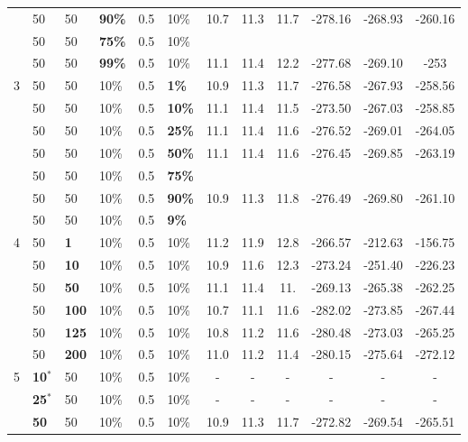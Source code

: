 \begin{sidewaystable}
\begin{tabular}{|l|l|l|l|l|l||c|c|c|c|c|c|}
    ~ & 50 & 50 & \textbf{90\%} & 0.5 & 10\% & 10.7 & 11.3 & 11.7 & -278.16 & -268.93 & -260.16 \\
    ~ & 50 & 50 & \textbf{75\%} & 0.5 & 10\% & ~ & ~ & ~ & ~ & ~ & ~ \\
    ~ & 50 & 50 & \textbf{99\%} & 0.5 & 10\% & 11.1 & 11.4 & 12.2 & -277.68 & -269.10 & -253 \\
    \hline
    3 & 50 & 50 & 10\% & 0.5 & \textbf{1\%} & 10.9 & 11.3 & 11.7 & -276.58 & -267.93 & -258.56 \\
    ~ & 50 & 50 & 10\% & 0.5 & \textbf{10\%} & 11.1 & 11.4 & 11.5 & -273.50 & -267.03 & -258.85 \\
    ~ & 50 & 50 & 10\% & 0.5 & \textbf{25\%} & 11.1 & 11.4 & 11.6 & -276.52 & -269.01 & -264.05 \\
    ~ & 50 & 50 & 10\% & 0.5 & \textbf{50\%} & 11.1 & 11.4 & 11.6 & -276.45 & -269.85 & -263.19 \\
    ~ & 50 & 50 & 10\% & 0.5 & \textbf{75\%} & ~ & ~ & ~ & ~ & ~ & ~ \\
    ~ & 50 & 50 & 10\% & 0.5 & \textbf{90\%} & 10.9 & 11.3 & 11.8 & -276.49 & -269.80 & -261.10 \\
    ~ & 50 & 50 & 10\% & 0.5 & \textbf{9\%} & ~ & ~ & ~ & ~ & ~ & ~ \\
    \hline
    4 & 50 & \textbf{1} & 10\% & 0.5 & 10\% &11.2 & 11.9 & 12.8 & -266.57 & -212.63 & -156.75 \\
    ~ & 50 & \textbf{10} & 10\% & 0.5 & 10\% & 10.9 & 11.6 & 12.3 & -273.24 & -251.40 & -226.23 \\
    ~ & 50 & \textbf{50} & 10\% & 0.5 & 10\% &  11.1 & 11.4 & 11. & -269.13 & -265.38 & -262.25 \\
    ~ & 50 & \textbf{100} & 10\% & 0.5 & 10\% & 10.7 & 11.1 & 11.6 & -282.02 & -273.85 & -267.44 \\
    ~ & 50 & \textbf{125} & 10\% & 0.5 & 10\% & 10.8 & 11.2 & 11.6 & -280.48 & -273.03 & -265.25 \\
    ~ & 50 & \textbf{200} & 10\% & 0.5 & 10\% & 11.0 & 11.2 & 11.4 & -280.15 & -275.64 & -272.12  \\
    \hline
    5 & \textbf{10$^*$} & 50 & 10\% & 0.5 & 10\% & - & - & - & - & - & - \\
    ~ & \textbf{25$^*$} & 50 & 10\% & 0.5 & 10\% & - & - & - & - & - & - \\
    ~ & \textbf{50} & 50 & 10\% & 0.5 & 10\% &10.9 & 11.3 & 11.7 & -272.82 & -269.54 & -265.51 \\

\end{tabular}
\end{sidewaystable}
